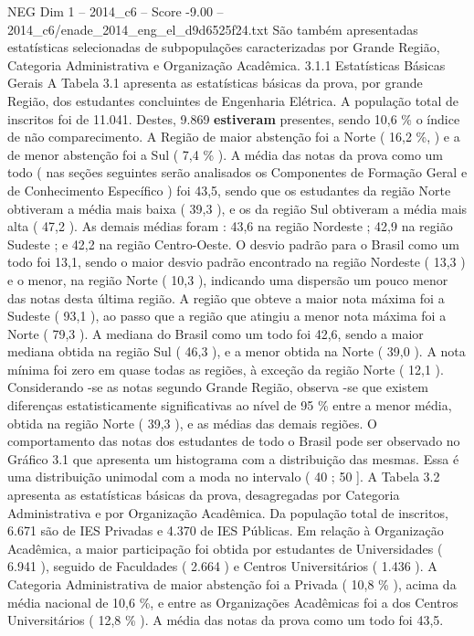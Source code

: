 \begin{textsample}{NEG Dim 1 – 2014\_c6 – Score -9.00 – 2014\_c6/enade\_2014\_eng\_el\_d9d6525f24.txt}
São também apresentadas estatísticas selecionadas de subpopulações caracterizadas por Grande Região, Categoria Administrativa e Organização Acadêmica. 3.1.1 Estatísticas Básicas Gerais A Tabela 3.1 apresenta as estatísticas básicas da prova, por grande Região, dos estudantes concluintes de Engenharia Elétrica.
A população total de inscritos foi de 11.041.
Destes, 9.869 \textbf{estiveram} presentes, sendo 10,6 \% o índice de não comparecimento.
A Região de maior abstenção foi a Norte ( 16,2 \%, ) e a de menor abstenção foi a Sul ( 7,4 \% ).
A média das notas da prova como um todo ( nas seções seguintes serão analisados os Componentes de Formação Geral e de Conhecimento Específico ) foi 43,5, sendo que os estudantes da região Norte obtiveram a média mais baixa ( 39,3 ), e os da região Sul obtiveram a média mais alta ( 47,2 ).
As demais médias foram : 43,6 na região Nordeste ; 42,9 na região Sudeste ; e 42,2 na região Centro-Oeste.
O desvio padrão para o Brasil como um todo foi 13,1, sendo o maior desvio padrão encontrado na região Nordeste ( 13,3 ) e o menor, na região Norte ( 10,3 ), indicando uma dispersão um pouco menor das notas desta última região.
A região que obteve a maior nota máxima foi a Sudeste ( 93,1 ), ao passo que a região que atingiu a menor nota máxima foi a Norte ( 79,3 ).
A mediana do Brasil como um todo foi 42,6, sendo a maior mediana obtida na região Sul ( 46,3 ), e a menor obtida na Norte ( 39,0 ).
A nota mínima foi zero em quase todas as regiões, à exceção da região Norte ( 12,1 ).
Considerando -se as notas segundo Grande Região, observa -se que existem diferenças estatisticamente significativas ao nível de 95 \% entre a menor média, obtida na região Norte ( 39,3 ), e as médias das demais regiões.
O comportamento das notas dos estudantes de todo o Brasil pode ser observado no Gráfico 3.1 que apresenta um histograma com a distribuição das mesmas.
Essa é uma distribuição unimodal com a moda no intervalo ( 40 ; 50 ].
A Tabela 3.2 apresenta as estatísticas básicas da prova, desagregadas por Categoria Administrativa e por Organização Acadêmica.
Da população total de inscritos, 6.671 são de IES Privadas e 4.370 de IES Públicas.
Em relação à Organização Acadêmica, a maior participação foi obtida por estudantes de Universidades ( 6.941 ), seguido de Faculdades ( 2.664 ) e Centros Universitários ( 1.436 ).
A Categoria Administrativa de maior abstenção foi a Privada ( 10,8 \% ), acima da média nacional de 10,6 \%, e entre as Organizações Acadêmicas foi a dos Centros Universitários ( 12,8 \% ).
A média das notas da prova como um todo foi 43,5.

\end{textsample}
